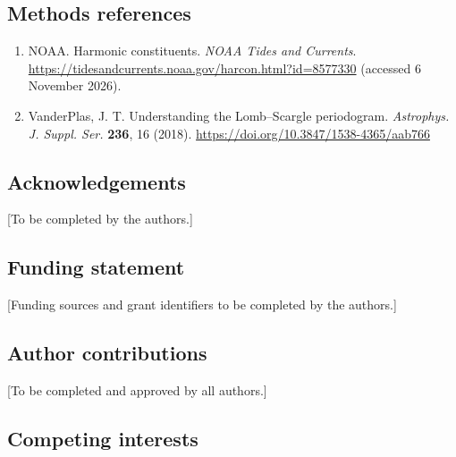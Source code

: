 \documentclass[
  12pt,
  a4paper,
]{article}
\providecommand{\tightlist}{%
  \setlength{\itemsep}{0pt}\setlength{\parskip}{0pt}}
\begin{document}
\singlespacing\fontsize{11}{13}\selectfont

\hypertarget{methods-references}{%
\subsection{Methods references}\label{methods-references}}

\begin{enumerate}
\def\labelenumi{\arabic{enumi}.}
\setcounter{enumi}{22}
\tightlist
\item
  NOAA. Harmonic constituents. \emph{NOAA Tides and Currents}.
  \url{https://tidesandcurrents.noaa.gov/harcon.html?id=8577330}
  (accessed 6 November 2026).
\item
  VanderPlas, J. T. Understanding the Lomb--Scargle periodogram.
  \emph{Astrophys. J. Suppl. Ser.} \textbf{236}, 16 (2018).
  \url{https://doi.org/10.3847/1538-4365/aab766}
\end{enumerate}

\clearpage

\singlespacing\fontsize{11}{13}\selectfont

\hypertarget{acknowledgements}{%
\subsection{Acknowledgements}\label{acknowledgements}}

{[}To be completed by the authors.{]}

\singlespacing\fontsize{11}{13}\selectfont

\hypertarget{funding-statement}{%
\subsection{Funding statement}\label{funding-statement}}

{[}Funding sources and grant identifiers to be completed by the
authors.{]}

\singlespacing\fontsize{11}{13}\selectfont

\hypertarget{author-contributions}{%
\subsection{Author contributions}\label{author-contributions}}

{[}To be completed and approved by all authors.{]}

\singlespacing\fontsize{11}{13}\selectfont

\hypertarget{competing-interests}{%
\subsection{Competing interests}\label{competing-interests}}
\end{document}
